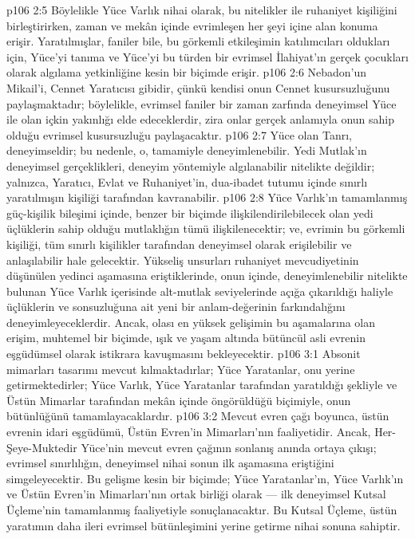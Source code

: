 \vs p106 2:5 Böylelikle Yüce Varlık nihai olarak, bu nitelikler ile ruhaniyet kişiliğini birleştirirken, zaman ve mekân içinde evrimleşen her şeyi içine alan konuma erişir. Yaratılmışlar, faniler bile, bu görkemli etkileşimin katılımcıları oldukları için, Yüce’yi tanıma ve Yüce’yi bu türden bir evrimsel İlahiyat’ın gerçek çocukları olarak algılama yetkinliğine kesin bir biçimde erişir.
\vs p106 2:6 Nebadon’un Mikail’i, Cennet Yaratıcısı gibidir, çünkü kendisi onun Cennet kusursuzluğunu paylaşmaktadır; böylelikle, evrimsel faniler bir zaman zarfında deneyimsel Yüce ile olan içkin yakınlığı elde edeceklerdir, zira onlar gerçek anlamıyla onun sahip olduğu evrimsel kusursuzluğu paylaşacaktır.
\vs p106 2:7 Yüce olan Tanrı, deneyimseldir; bu nedenle, o, tamamiyle deneyimlenebilir. Yedi Mutlak’ın deneyimsel gerçeklikleri, deneyim yöntemiyle algılanabilir nitelikte değildir; yalnızca, Yaratıcı, Evlat ve Ruhaniyet’in, dua\hyp{}ibadet tutumu içinde sınırlı yaratılmışın kişiliği tarafından kavranabilir.
\vs p106 2:8 Yüce Varlık’ın tamamlanmış güç\hyp{}kişilik bileşimi içinde, benzer bir biçimde ilişkilendirilebilecek olan yedi üçlüklerin sahip olduğu mutlaklığın tümü ilişkilenecektir; ve, evrimin bu görkemli kişiliği, tüm sınırlı kişilikler tarafından deneyimsel olarak erişilebilir ve anlaşılabilir hale gelecektir. Yükseliş unsurları ruhaniyet mevcudiyetinin düşünülen yedinci aşamasına eriştiklerinde, onun içinde, deneyimlenebilir nitelikte bulunan Yüce Varlık içerisinde alt\hyp{}mutlak seviyelerinde açığa çıkarıldığı haliyle üçlüklerin ve sonsuzluğuna ait yeni bir anlam\hyp{}değerinin farkındalığını deneyimleyeceklerdir. Ancak, olası en yüksek gelişimin bu aşamalarına olan erişim, muhtemel bir biçimde, ışık ve yaşam altında bütüncül asli evrenin eşgüdümsel olarak istikrara kavuşmasını bekleyecektir.
\vs p106 3:1 Absonit mimarları tasarımı mevcut kılmaktadırlar; Yüce Yaratanlar, onu yerine getirmektedirler; Yüce Varlık, Yüce Yaratanlar tarafından yaratıldığı şekliyle ve Üstün Mimarlar tarafından mekân içinde öngörüldüğü biçimiyle, onun bütünlüğünü tamamlayacaklardır.
\vs p106 3:2 Mevcut evren çağı boyunca, üstün evrenin idari eşgüdümü, Üstün Evren’in Mimarları’nın faaliyetidir. Ancak, Her\hyp{}Şeye\hyp{}Muktedir Yüce’nin mevcut evren çağının sonlanış anında ortaya çıkışı; evrimsel sınırlılığın, deneyimsel nihai sonun ilk aşamasına eriştiğini simgeleyecektir. Bu gelişme kesin bir biçimde; Yüce Yaratanlar’ın, Yüce Varlık’ın ve Üstün Evren’in Mimarları’nın ortak birliği olarak --- ilk deneyimsel Kutsal Üçleme’nin tamamlanmış faaliyetiyle sonuçlanacaktır. Bu Kutsal Üçleme, üstün yaratımın daha ileri evrimsel bütünleşimini yerine getirme nihai sonuna sahiptir.
